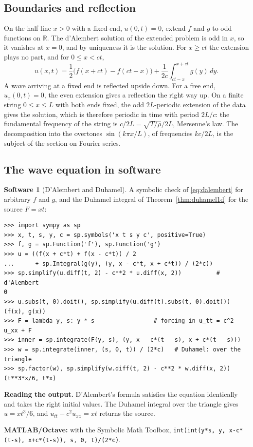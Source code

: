 \documentclass[11pt,a4paper]{article}
\numberwithin{equation}{section}
\theoremstyle{definition}
\newtheorem{software}[thm]{Software}
\begin{document}
\subsection{Boundaries and reflection}
\label{ssec:reflection}

On the half-line $x > 0$ with a fixed end, $u(0, t) = 0$, extend $f$ and $g$ to odd functions on $\mathbb R$. The d'Alembert solution of the extended problem is odd in $x$, so it vanishes at $x = 0$, and by uniqueness it is the solution. For $x \geq ct$ the extension plays no part, and for $0 \leq x < ct$,
\[
u(x, t) = \frac12\bigl(f(x + ct) - f(ct - x)\bigr) + \frac1{2c}\int_{ct - x}^{x + ct}g(y)\,dy .
\]
A wave arriving at a fixed end is reflected upside down. For a free end, $u_x(0, t) = 0$, the even extension gives a reflection the right way up. On a finite string $0 \leq x \leq L$ with both ends fixed, the odd $2L$-periodic extension of the data gives the solution, which is therefore periodic in time with period
$2L/c$: the fundamental frequency of the string is $c/2L = \sqrt{T/\rho}/2L$, Mersenne's law. The decomposition into the overtones $\sin(k\pi x/L)$, of frequencies $kc/2L$, is the subject of the section on Fourier series.

\subsection{The wave equation in software}
\label{ssec:software4}

\begin{software}[D'Alembert and Duhamel]
\label{sw:dalembert}
A symbolic check of \eqref{eq:dalembert} for arbitrary $f$ and $g$, and the Duhamel integral of Theorem~\ref{thm:duhamel1d} for the source $F = xt$:
{\small\begin{verbatim}
>>> import sympy as sp
>>> x, t, s, y, c = sp.symbols('x t s y c', positive=True)
>>> f, g = sp.Function('f'), sp.Function('g')
>>> u = ((f(x + c*t) + f(x - c*t)) / 2
...      + sp.Integral(g(y), (y, x - c*t, x + c*t)) / (2*c))
>>> sp.simplify(u.diff(t, 2) - c**2 * u.diff(x, 2))          # d'Alembert
0
>>> u.subs(t, 0).doit(), sp.simplify(u.diff(t).subs(t, 0).doit())
(f(x), g(x))
>>> F = lambda y, s: y * s                 # forcing in u_tt = c^2 u_xx + F
>>> inner = sp.integrate(F(y, s), (y, x - c*(t - s), x + c*(t - s)))
>>> w = sp.integrate(inner, (s, 0, t)) / (2*c)   # Duhamel: over the triangle
>>> sp.factor(w), sp.simplify(w.diff(t, 2) - c**2 * w.diff(x, 2))
(t**3*x/6, t*x)
\end{verbatim}}
\textbf{Reading the output.} D'Alembert's formula satisfies the equation identically and takes the right initial values. The Duhamel integral over the triangle gives $u = xt^3/6$, and $u_{tt} - c^2u_{xx} = xt$ returns the source.

\textbf{MATLAB/Octave:} with the Symbolic Math Toolbox, \texttt{int(int(y*s, y, x-c*(t-s), x+c*(t-s)), s, 0, t)/(2*c)}.
\end{software}
\end{document}

